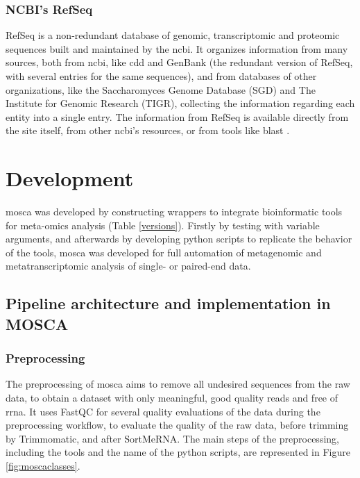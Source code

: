 \documentclass[
  oneside,
  11pt, a4paper,
  footinclude=true,
  headinclude=true,
  cleardoublepage=empty
]{scrbook}
\begin{document}
    \subsection{NCBI's RefSeq}
    
    RefSeq is a non-redundant database of genomic, transcriptomic and proteomic sequences built and maintained by the \gls{ncbi}. It organizes information from many sources, both from \gls{ncbi}, like \gls{cdd} and GenBank (the redundant version of RefSeq, with several entries for the same sequences), and from databases of other organizations, like the Saccharomyces Genome Database (SGD) and The Institute for Genomic Research (TIGR), collecting the information regarding each entity into a single entry. The information from RefSeq is available directly from the site itself, from other \gls{ncbi}'s resources, or from tools like \gls{blast} \citep{Pruitt2007a, OLeary2016}.

	\chapter{Development}
	
	\gls{mosca} was developed by constructing wrappers to integrate bioinformatic tools for meta-omics analysis (Table \ref{versions}). Firstly by testing with variable arguments, and afterwards by developing python scripts to replicate the behavior of the tools, \gls{mosca} was developed for full automation of metagenomic and metatranscriptomic analysis of single- or paired-end data.

    \section{Pipeline architecture and implementation in MOSCA}
    
    \subsection{Preprocessing}
    
    The preprocessing of \gls{mosca} aims to remove all undesired sequences from the raw data, to obtain a dataset with only meaningful, good quality reads and free of \gls{rrna}. It uses FastQC for several quality evaluations of the data during the preprocessing workflow, to evaluate the quality of the raw data, before trimming by Trimmomatic, and after SortMeRNA. The main steps of the preprocessing, including the tools and the name of the python scripts, are represented in Figure \ref{fig:moscaclasses}.
    
\end{document}
